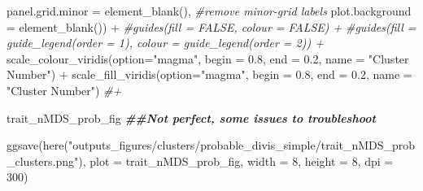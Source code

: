 \documentclass[
]{article}
\newenvironment{Shaded}{\begin{snugshade}}{\end{snugshade}}
\newcommand{\AttributeTok}[1]{\textcolor[rgb]{0.77,0.63,0.00}{#1}}
\newcommand{\CommentTok}[1]{\textcolor[rgb]{0.56,0.35,0.01}{\textit{#1}}}
\newcommand{\DecValTok}[1]{\textcolor[rgb]{0.00,0.00,0.81}{#1}}
\newcommand{\DocumentationTok}[1]{\textcolor[rgb]{0.56,0.35,0.01}{\textbf{\textit{#1}}}}
\newcommand{\FloatTok}[1]{\textcolor[rgb]{0.00,0.00,0.81}{#1}}
\newcommand{\FunctionTok}[1]{\textcolor[rgb]{0.00,0.00,0.00}{#1}}
\newcommand{\NormalTok}[1]{#1}
\newcommand{\SpecialCharTok}[1]{\textcolor[rgb]{0.00,0.00,0.00}{#1}}
\newcommand{\StringTok}[1]{\textcolor[rgb]{0.31,0.60,0.02}{#1}}
\begin{document}
\begin{Shaded}
\begin{Highlighting}[]
        \AttributeTok{panel.grid.minor =} \FunctionTok{element\_blank}\NormalTok{(),  }\CommentTok{\#remove minor{-}grid labels}
        \AttributeTok{plot.background =} \FunctionTok{element\_blank}\NormalTok{()) }\SpecialCharTok{+}
  \CommentTok{\#guides(fill = FALSE, colour = FALSE) +}
  \CommentTok{\#guides(fill = guide\_legend(order = 1), colour = guide\_legend(order = 2)) +}
  \FunctionTok{scale\_colour\_viridis}\NormalTok{(}\AttributeTok{option=}\StringTok{"magma"}\NormalTok{, }\AttributeTok{begin =} \FloatTok{0.8}\NormalTok{, }\AttributeTok{end =} \FloatTok{0.2}\NormalTok{, }\AttributeTok{name =} \StringTok{"Cluster Number"}\NormalTok{) }\SpecialCharTok{+} 
  \FunctionTok{scale\_fill\_viridis}\NormalTok{(}\AttributeTok{option=}\StringTok{"magma"}\NormalTok{, }\AttributeTok{begin =} \FloatTok{0.8}\NormalTok{, }\AttributeTok{end =} \FloatTok{0.2}\NormalTok{, }\AttributeTok{name =} \StringTok{"Cluster Number"}\NormalTok{) }\CommentTok{\#+}
  
\NormalTok{trait\_nMDS\_prob\_fig}
\DocumentationTok{\#\#Not perfect, some issues to troubleshoot}

\FunctionTok{ggsave}\NormalTok{(}\FunctionTok{here}\NormalTok{(}\StringTok{"outputs\_figures/clusters/probable\_divis\_simple/trait\_nMDS\_prob\_clusters.png"}\NormalTok{), }
       \AttributeTok{plot =}\NormalTok{ trait\_nMDS\_prob\_fig, }\AttributeTok{width =} \DecValTok{8}\NormalTok{, }\AttributeTok{height =} \DecValTok{8}\NormalTok{, }\AttributeTok{dpi =} \DecValTok{300}\NormalTok{)}
\end{Highlighting}
\end{Shaded}
\end{document}
